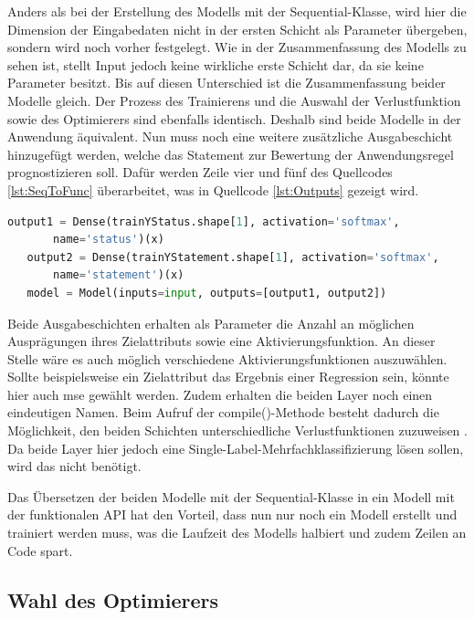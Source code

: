 Anders als bei der Erstellung des Modells mit der \glqq Sequential\grqq{}-Klasse, wird hier die Dimension der Eingabedaten nicht in der ersten Schicht als Parameter übergeben,
sondern wird noch vorher festgelegt. Wie in der Zusammenfassung des Modells zu sehen ist, stellt \glqq Input\grqq{} jedoch keine wirkliche erste Schicht dar,
da sie keine Parameter besitzt. Bis auf diesen Unterschied ist die Zusammenfassung beider Modelle gleich. Der Prozess des Trainierens und die Auswahl der Verlustfunktion
sowie des Optimierers sind ebenfalls identisch. Deshalb sind beide Modelle in der Anwendung äquivalent. Nun muss noch eine weitere zusätzliche Ausgabeschicht hinzugefügt werden,
welche das Statement zur Bewertung der Anwendungsregel prognostizieren soll. Dafür werden Zeile vier und fünf des Quellcodes \ref*{lst:SeqToFunc} überarbeitet, was 
in Quellcode \ref*{lst:Outputs} gezeigt wird.
\\
\begin{lstlisting}[language = python, caption={Zweite Ausgabeschicht hinzufügen},captionpos=b, label = lst:Outputs, floatplacement=H]
   output1 = Dense(trainYStatus.shape[1], activation='softmax', 
       name='status')(x)
   output2 = Dense(trainYStatement.shape[1], activation='softmax', 
       name='statement')(x)
   model = Model(inputs=input, outputs=[output1, output2])
\end{lstlisting}

Beide Ausgabeschichten erhalten als Parameter die Anzahl an möglichen Ausprägungen ihres Zielattributs sowie eine Aktivierungsfunktion. An dieser Stelle wäre es auch
möglich verschiedene Aktivierungsfunktionen auszuwählen. Sollte beispielsweise ein Zielattribut das Ergebnis einer Regression sein, könnte hier auch 
\glqq mse\grqq{} gewählt werden. Zudem erhalten die beiden Layer noch einen eindeutigen Namen. Beim Aufruf der compile()-Methode besteht dadurch die Möglichkeit,
den beiden Schichten unterschiedliche Verlustfunktionen zuzuweisen \cite[vgl. S.308f.]{DL_PY}. Da beide Layer hier jedoch eine Single-Label-Mehrfachklassifizierung lösen sollen,
wird das nicht benötigt. 

Das Übersetzen der beiden Modelle mit der \glqq Sequential\grqq{}-Klasse in ein Modell mit der funktionalen \ac{API} hat den Vorteil, dass nun nur noch ein Modell 
erstellt und trainiert werden muss, was die Laufzeit des Modells halbiert und zudem Zeilen an Code spart.

\subsection{Wahl des Optimierers}

